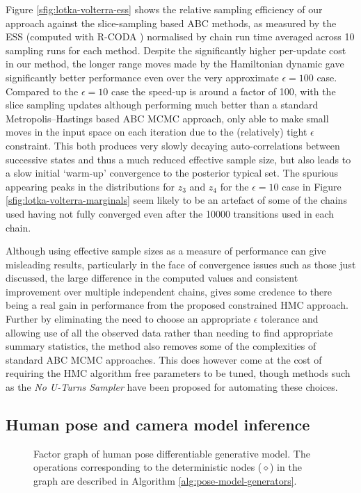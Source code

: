 Figure \ref{sfig:lotka-volterra-ess} shows the relative sampling efficiency of our approach against the slice-sampling based \ac{ABC} methods, as measured by the \ac{ESS} (computed with R-CODA \citep{plummer2006coda}) normalised by chain run time averaged across 10 sampling runs for each method. Despite the significantly higher per-update cost in our method, the longer range moves made by the Hamiltonian dynamic gave significantly better performance even over the very approximate $\epsilon=100$ case. Compared to the $\epsilon = 10$ case the speed-up is around a factor of 100, with the slice sampling updates although performing much better than a standard Metropolis--Hastings based \ac{ABC} \ac{MCMC} approach, only able to make small moves in the input space on each iteration due to the (relatively) tight $\epsilon$ constraint. This both produces very slowly decaying auto-correlations between successive states and thus a much reduced effective sample size, but also leads to a slow initial `warm-up' convergence to the posterior typical set. The spurious appearing peaks in the distributions for $z_3$ and $z_4$ for the $\epsilon = 10$ case in Figure \ref{sfig:lotka-volterra-marginals} seem likely to be an artefact of some of the chains used having not fully converged even after the 10000 transitions used in each chain.

Although using effective sample sizes as a measure of performance can give misleading results, particularly in the face of convergence issues such as those just discussed, the large difference in the computed values and consistent improvement over multiple independent chains, gives some credence to there being a real gain in performance from the proposed constrained \ac{HMC} approach. Further by eliminating the need to choose an appropriate $\epsilon$ tolerance and allowing use of all the observed data rather than needing to find appropriate summary statistics, the method also removes some of the complexities of standard \ac{ABC} \ac{MCMC} approaches. This does however come at the cost of requiring the \ac{HMC} algorithm free parameters to be tuned, though methods such as the \emph{No U-Turns Sampler} \citep{hoffman2014no} have been proposed for automating these choices.

\subsection{Human pose and camera model inference}

\begin{figure}[!t]
\centering
{}
\caption[Human pose generative model factor graph.]{Factor graph of human pose differentiable generative model. The operations corresponding to the deterministic nodes ($\diamond$) in the graph are described in Algorithm \ref{alg:pose-model-generators}.}
\label{fig:pose-dgm-factor-graph}
\end{figure}

